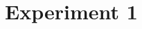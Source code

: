 \documentclass[pdflatex,sn-mathphys]{sn-jnl}%
\theoremstyle{thmstyleone}%
\theoremstyle{thmstyletwo}%
\theoremstyle{thmstylethree}%
\begin{document}
% 
% 
% 




\maketitle

\section{Experiment 1}\label{sec:exp1}
\end{document}
